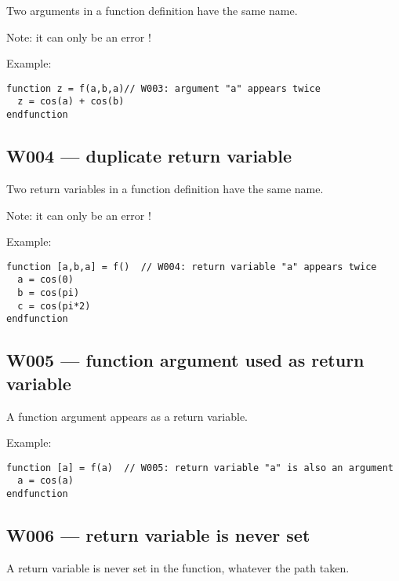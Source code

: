 Two arguments in a function definition have the same name.



Note: it can only be an error !



Example:\begin{verbatim}
function z = f(a,b,a)// W003: argument "a" appears twice
  z = cos(a) + cos(b)
endfunction
\end{verbatim}




\subsection{W004 --- duplicate return variable  }




Two return variables in a function definition have the same name.



Note: it can only be an error !



Example:\begin{verbatim}
function [a,b,a] = f()  // W004: return variable "a" appears twice
  a = cos(0)
  b = cos(pi)
  c = cos(pi*2)
endfunction
\end{verbatim}




\subsection{W005 --- function argument used as return variable  }




A function argument appears as a return variable.



Example:\begin{verbatim}
function [a] = f(a)  // W005: return variable "a" is also an argument
  a = cos(a)
endfunction
\end{verbatim}




\subsection{W006 --- return variable is never set}




A return variable is never set in the function, whatever the path taken.



